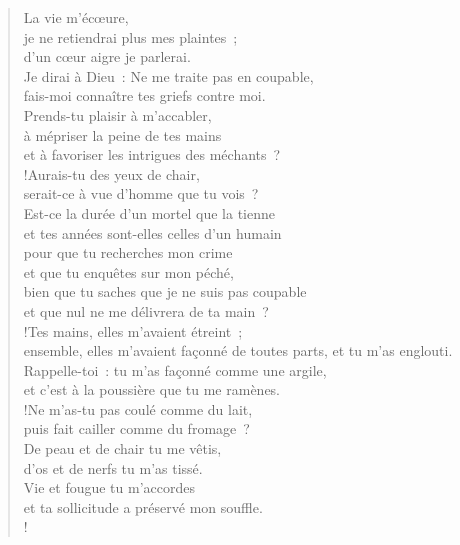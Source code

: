 \documentclass[french,twoside]{book} %
\def\mednobreak{\ifdim\lastskip<\medskipamount
  \removelastskip\nopagebreak\medskip\fi}
\newcommand{\labelblock}[1]{\medbreak{\noindent\color{rubric}\bfseries #1}\par\mednobreak}
\begin{document}
\begin{verse}
La vie m’écœure, \\
je ne retiendrai plus mes plaintes ; \\
d’un cœur aigre je parlerai.\\
Je dirai à Dieu : Ne me traite pas en coupable, \\
fais-moi connaître tes griefs contre moi.\\
Prends-tu plaisir à m’accabler, \\
à mépriser la peine de tes mains \\
et à favoriser les intrigues des méchants ?\\!Aurais-tu des yeux de chair, \\
serait-ce à vue d’homme que tu vois ?\\
Est-ce la durée d’un mortel que la tienne \\
et tes années sont-elles celles d’un humain\\
pour que tu recherches mon crime \\
et que tu enquêtes sur mon péché,\\
bien que tu saches que je ne suis pas coupable \\
et que nul ne me délivrera de ta main ?\\!Tes mains, elles m’avaient étreint ; \\
ensemble, elles m’avaient façonné de toutes parts, et tu m’as englouti.\\
Rappelle-toi : tu m’as façonné comme une argile, \\
et c’est à la poussière que tu me ramènes.\\!Ne m’as-tu pas coulé comme du lait, \\
puis fait cailler comme du fromage ?\\
De peau et de chair tu me vêtis, \\
d’os et de nerfs tu m’as tissé.\\
Vie et fougue tu m’accordes \\
et ta sollicitude a préservé mon souffle.\\!
\end{verse}

\labelblock{Le tigre en chasse}
\end{document}
